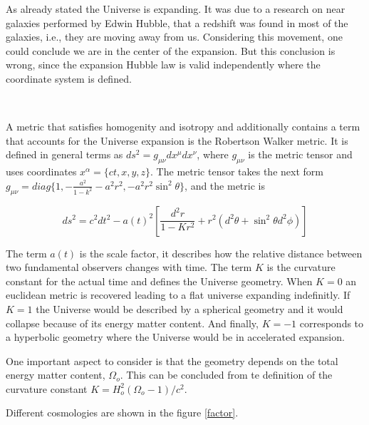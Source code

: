 As already stated the Universe is expanding. It was due to a research on near 
galaxies performed by Edwin Hubble, that a redshift was found in most of the 
galaxies, i.e., they are moving away from us. 
Considering this movement, one could conclude we are in the center of the 
expansion. But this conclusion is wrong, since the expansion Hubble law is
valid independently where the coordinate system is defined. 

\

A metric that satisfies homogenity and isotropy and additionally
contains a term that accounts for the Universe expansion is the Robertson 
Walker metric. It is defined in general terms as $ds^2 = g_{\mu\nu}dx^{\mu}dx^{\nu}$, 
where $g_{\mu\nu}$ is the metric tensor and uses coordinates $x^{\alpha} = \{ct,x,y,z\}$.
The metric tensor takes the next form $ g_{\mu\nu} = diag\{1,-\frac{a^2}{1-k^2}
-a^2r^2,-a^2r^2\sin^2\theta\}$, and the metric is

\begin{equation}
ds^2= c^2dt^2-a(t)^2\left[\frac{d^2r}{1-Kr^2} +r^2(d^2\theta
 + \sin^2\theta d^2\phi )\right]
\label{metric}
\end{equation} 	

The term $a(t)$ is the scale factor, it describes how the relative
distance between two fundamental observers changes with time. 
The term $K$ is the curvature constant for the actual time and defines
the Universe geometry. When $K=0$ an euclidean metric is recovered 
leading to a flat universe expanding indefinitly. If $K=1$ the Universe
would be described by a spherical geometry and it would collapse because
of its energy matter content. And finally, $K=-1$ corresponds to a
hyperbolic geometry where the Universe would be in accelerated expansion.  

One important aspect to consider is that the geometry depends on the 
total energy matter content, $\Omega_o$. This can be concluded from
te definition of the curvature constant $K = H_o^2(\Omega_o -1)/c^2$. 

Different cosmologies are shown in the figure \ref{factor}. 

